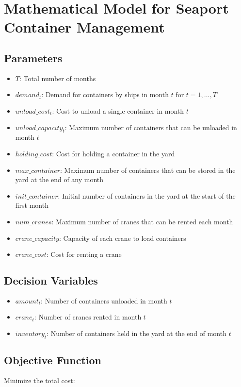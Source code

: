 \documentclass{article}
\begin{document}
\section*{Mathematical Model for Seaport Container Management}

\subsection*{Parameters}
\begin{itemize}
    \item $T$: Total number of months
    \item $demand_{t}$: Demand for containers by ships in month $t$ for $t = 1, \ldots, T$
    \item $unload\_cost_{t}$: Cost to unload a single container in month $t$
    \item $unload\_capacity_{t}$: Maximum number of containers that can be unloaded in month $t$
    \item $holding\_cost$: Cost for holding a container in the yard
    \item $max\_container$: Maximum number of containers that can be stored in the yard at the end of any month
    \item $init\_container$: Initial number of containers in the yard at the start of the first month
    \item $num\_cranes$: Maximum number of cranes that can be rented each month
    \item $crane\_capacity$: Capacity of each crane to load containers
    \item $crane\_cost$: Cost for renting a crane
\end{itemize}

\subsection*{Decision Variables}
\begin{itemize}
    \item $amount_{t}$: Number of containers unloaded in month $t$
    \item $crane_{t}$: Number of cranes rented in month $t$
    \item $inventory_{t}$: Number of containers held in the yard at the end of month $t$
\end{itemize}

\subsection*{Objective Function}
Minimize the total cost:
\end{document}
